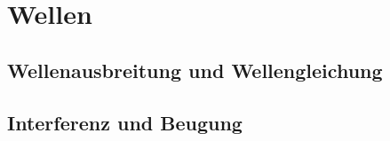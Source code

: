 \section{Wellen}%
\label{wellen:sec:wellen}

\subsection{Wellenausbreitung und Wellengleichung}%
\label{wellen:sub:wellenausbreitung_und_wellengleichung}

\subsection{Interferenz und Beugung}%
\label{wellen:sub:interferenz_und_beugung}

